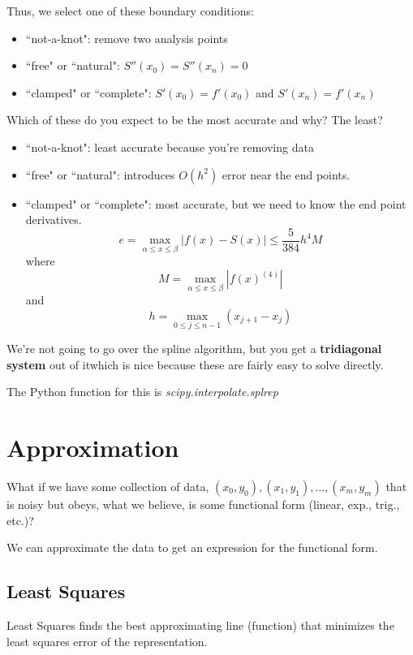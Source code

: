 \documentclass[12pt]{article}
\begin{document}
Thus, we select one of these boundary conditions:
\begin{itemize}
\item ``not-a-knot": remove two analysis points
\item ``free" or ``natural": $S''(x_0) = S''(x_n) = 0$ 
\item ``clamped" or ``complete": $S'(x_0) = f'(x_0)$ and $S'(x_n) = f'(x_n)$ 
\end{itemize}

Which of these do you expect to be the most accurate and why? The least?
\begin{itemize}
\item ``not-a-knot": least accurate because you're removing data
\item ``free" or ``natural": introduces $O(h^2)$ error near the end points.
\item ``clamped" or ``complete": most accurate, but we need to know the end point derivatives.
\[e = \max_{\alpha \leq x \leq \beta} |f(x) - S(x)| \leq \frac{5}{384}h^4 M\]
where
\[M = \max_{\alpha \leq x \leq \beta} |f(x)^{(4)}|\]
and
\[h = \max_{0 \leq j \leq n-1} (x_{j+1} - x_{j})\]
\end{itemize}

We're not going to go over the spline algorithm, but you get a \textbf{tridiagonal system} out of it\textemdash which is nice because these are fairly easy to solve directly. %

The Python function for this is \textit{scipy.interpolate.splrep}


\section*{Approximation}

What if we have some collection of data, $(x_0, y_0), (x_1, y_1),\dots, (x_m, y_m)$ that is noisy but obeys, what we believe, is some functional form (linear, exp., trig., etc.)?

We can approximate the data to get an expression for the functional form.

\subsection*{Least Squares}
Least Squares finds the best approximating line (function) that minimizes the least squares error of the representation.
\end{document}
